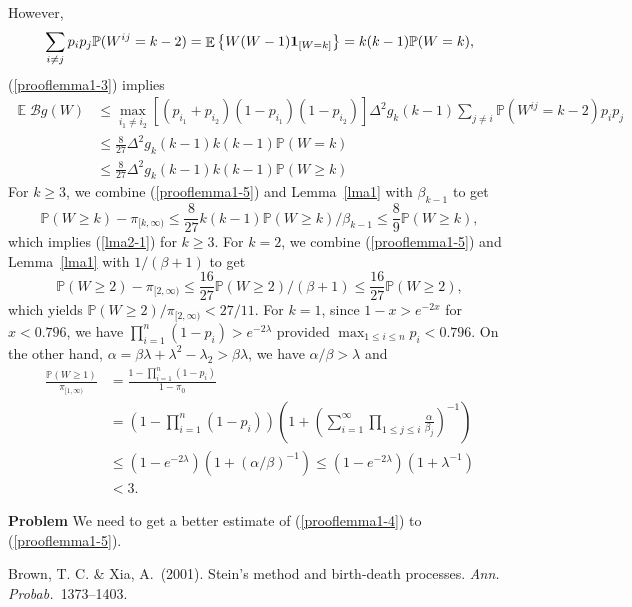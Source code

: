 \documentclass[12pt]{article}
\newcommand{\Pro}{\mathbb{P}}
\newcommand{\prob}{\Pro}
\DeclareMathOperator{\E}{\mathbb{E}}
\newcommand{\mean}{\E}
\newcommand{\bone}{{\bf 1}}
\newcommand{\scrB}{{\mathscr B}}
\def\Ref#1{(\ref{#1})}
\newcommand{\qed}{\nopagebreak\hspace*{\fill}
{\vrule width6pt height6ptdepth0pt}\par}
\numberwithin{equation}{section}
\begin{document}
However,
$$\sum_{i\ne j}p_ip_j\prob(W^{ij}=k-2)=\mean \left\{W(W-1)\bone_{[W=k]}\right\}=k(k-1)\prob(W=k),$$
\Ref{prooflemma1-3} implies
 \begin{align}
 \mean \scrB g(W)
 &\le \max_{i_1\ne i_2}[(p_{i_1}+p_{i_2})(1-p_{i_1})(1-p_{i_2})]\Delta^2 g_k(k-1)\sum_{j\ne i}\prob(W^{ij}=k-2)p_ip_j\nonumber\\
 &\le \frac8{27}\Delta^2 g_k(k-1)k(k-1)\prob(W=k)
 \label{prooflemma1-4}\\
 &\le \frac8{27}\Delta^2 g_k(k-1)k(k-1)\prob(W\ge k)
 \label{prooflemma1-5}
 \end{align}
 For $k\ge 3$, we combine \Ref{prooflemma1-5} and Lemma~\ref{lma1} with $\beta_{k-1}$ to get
 $$\prob(W\ge k)-\pi_{[k,\infty)}\le \frac8{27}k(k-1)\prob(W\ge k)/\beta_{k-1}\le \frac89\prob(W\ge k),$$
 which implies \Ref{lma2-1} for $k\ge 3$. For $k=2$, we combine \Ref{prooflemma1-5} and Lemma~\ref{lma1} with $1/(\beta+1)$ to get
  $$\prob(W\ge 2)-\pi_{[2,\infty)}\le \frac{16}{27}\prob(W\ge 2)/(\beta+1)\le \frac{16}{27}\prob(W\ge 2),$$
  which yields
  $\prob(W\ge 2)/\pi_{[2,\infty)}<27/11.$ For $k=1$, since $1-x>e^{-2x}$ for $x<0.796$, we have $\prod_{i=1}^n(1-p_i)>e^{-2\lambda}$ provided $\max_{1\le i\le n}p_i<0.796$. On the other hand, $\alpha=\beta\lambda+\lambda^2-\lambda_2>\beta\lambda$, we have $\alpha/\beta>\lambda$ and
  \begin{align*}
  \frac{\prob(W\ge 1)}{\pi_{[1,\infty)}}&=\frac{1-\prod_{i=1}^n(1-p_i)}{1-\pi_0}\\
  &=\left(1-\prod_{i=1}^n(1-p_i)\right)\left(1+\left(\sum_{i=1}^\infty\prod_{1\le j\le i}\frac \alpha{\beta_j}\right)^{-1}\right)\\
  &\le (1-e^{-2\lambda})(1+(\alpha/\beta)^{-1})\le (1-e^{-2\lambda})(1+\lambda^{-1})\\
  &<3.
  \end{align*}
  \qed
 
 {\bf Problem} We need to get a better estimate of \Ref{prooflemma1-4} to \Ref{prooflemma1-5}.
 

\def\ac{{Academic Press}~}
\def\aap{{Adv. Appl. Prob.}~}
\def\ap{{Ann. Probab.}~}
\def\anap{{Ann. Appl. Probab.}~}
\def\eljp{{\it Electron.\ J.~Probab.\/}~} 
\def\jap{{J. Appl. Probab.}~}
\def\jws{{John Wiley~$\&$ Sons}~}
\def\ny{{New York}~}
\def\ptrf{{Probab. Theory Related Fields}~}
\def\sp{{Springer}~}
\def\spa{{Stochastic Process. Appl.}~}
\def\sv{{Springer-Verlag}~}
\def\tpa{{Theory Probab. Appl.}~}
\def\zw{{Z. Wahrsch. Verw. Gebiete}~}

 \begin{thebibliography}{9}

 Brown, T. C. \& Xia, A.~(2001). Stein's method and birth-death processes. \emph{\ap}1373--1403.
 
 \end{thebibliography}
\end{document}
